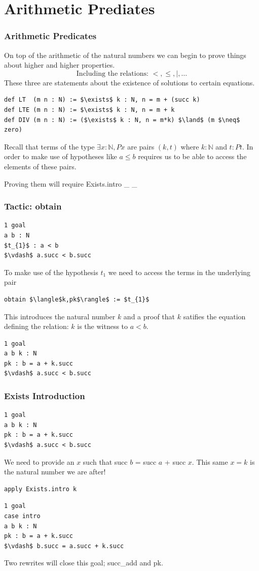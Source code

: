 \documentclass{beamer}
\theoremstyle{indentDefn} \newtheorem{defn}[]{Definition}
\begin{document}
\section{Arithmetic Prediates}

\begin{frame}[fragile]
	\frametitle{Arithmetic Predicates}
	
	On top of the arithmetic of the natural numbers we can begin to prove things about higher and higher properties. 	
	$$\text{Including the relations: } <,\leq, |, \dots$$
	These three are statements about the existence of solutions to certain equations.	
	{\footnotesize\begin{lstlisting}
def LT  (m n : N) := $\exists$ k : N, n = m + (succ k)
def LTE (m n : N) := $\exists$ k : N, n = m + k
def DIV (m n : N) := ($\exists$ k : N, n = m*k) $\land$ (m $\neq$ zero)	
	\end{lstlisting}}
	Recall that terms of the type $\exists x: \mathbb{N}, P x$ are pairs $(k, t)$ where $k : \mathbb{N}$ and $t : P t$. In order to make use of hypotheses like $a \leq b$ requires us to be able to access the elements of these pairs.
	
	Proving them will require Exists.intro \_ \_
\end{frame}

\begin{frame}[fragile]
	\frametitle{Tactic: obtain}	
	{\footnotesize\begin{lstlisting}
1 goal
a b : N
$t_{1}$ : a < b
$\vdash$ a.succ < b.succ	
	\end{lstlisting}}	
To make use of the hypothesis $t_{1}$ we need to access the terms in the underlying pair 
	{\footnotesize\begin{lstlisting}
obtain $\langle$k,pk$\rangle$ := $t_{1}$
	\end{lstlisting}}
This introduces the natural number $k$ and a proof that $k$ satifies the equation defining the relation: $k$ is the witness to $a < b$.
	{\footnotesize\begin{lstlisting}
1 goal
a b k : N
pk : b = a + k.succ
$\vdash$ a.succ < b.succ
	\end{lstlisting}}
\end{frame}

\begin{frame}[fragile]
	\frametitle{Exists Introduction}
	{\footnotesize\begin{lstlisting}
1 goal
a b k : N
pk : b = a + k.succ
$\vdash$ a.succ < b.succ
	\end{lstlisting}}
	We need to provide an $x$ such that succ $b$ = succ $a$ + succ $x$.
	This same $x = k$ is the natural number we are after!
	{\footnotesize\begin{lstlisting}
apply Exists.intro k
	\end{lstlisting}}	
	{\footnotesize\begin{lstlisting}
1 goal
case intro
a b k : N
pk : b = a + k.succ
$\vdash$ b.succ = a.succ + k.succ
	\end{lstlisting}}	
	Two rewrites will close this goal; succ\_add and pk.
\end{frame}
\end{document}
